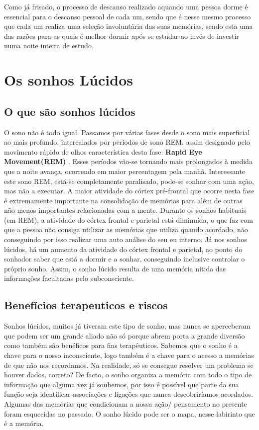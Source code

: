 \documentclass{report}
\begin{document}
Como já frisado, o processo de descanso realizado aquando uma pessoa dorme é essencial para o descanso pessoal de cada um, sendo que é nesse mesmo processo que cada um realiza uma seleção involuntária das suas memórias, sendo esta uma das razões para as quais é melhor dormir após se estudar ao invés de investir numa noite inteira de estudo.


\chapter{Os sonhos Lúcidos}
\label{chap.ossonhoslúcidos}
\section{O que são sonhos lúcidos}
O sono não é todo igual. Passamos por várias fases desde o sono mais superficial ao mais profundo, intercalados por períodos de sono REM, assim designado pelo movimento rápido de olhos característica desta fase: \textbf{Rapid Eye Movement(REM)} . Esses períodos vão-se tornando mais prolongados à medida que a noite avança, ocorrendo em maior percentagem pela manhã. Interessante este sono REM, está-se completamente paralisado, pode-se sonhar com uma ação, mas não a executar. A maior atividade do córtex pré-frontal que ocorre nesta fase é extremamente importante na consolidação de memórias para além de outras não menos importantes relacionadas com a mente. Durante os sonhos habituais (em REM), a atividade do córtex frontal e parietal está diminuída, o que faz com que a pessoa não consiga utilizar as memórias que utiliza quando acordado, não conseguindo por isso realizar uma auto análise do seu eu interno. Já nos sonhos lúcidos, há um aumento da atividade do córtex frontal e parietal, ao ponto do sonhador saber que está a dormir e a sonhar, conseguindo inclusive controlar o próprio sonho. Assim, o sonho lúcido resulta de uma memória nítida das informações facultadas pelo subconsciente.



\section{Benefícios terapeuticos e riscos}
Sonhos lúcidos, muitos já tiveram este tipo de sonho, mas nunca se aperceberam que podem ser um grande aliado não só porque abrem porta a grande diversão como também são benéficos para fins terapêuticos. Sabemos que o sonho é a chave para o nosso inconsciente, logo também é a chave para o acesso a memórias de que não nos recordamos. Na realidade, só se consegue resolver um problema se houver dados, correto?
De facto, o sonho organiza a memória com todo o tipo de informação que alguma vez já soubemos, por isso é possível que parte da sua função seja identificar associações e ligações que nunca descobriríamos acordados. Algumas das memórias que condicionam a nossa ação/ pensamento no presente foram esquecidas no passado. O sonho lúcido pode ser o mapa, nesse labirinto que é a memória.
 
\end{document}
